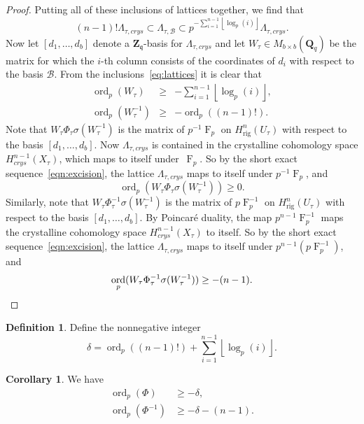 \documentclass[a4paper,11pt]{article}
\numberwithin{equation}{section}
\providecommand{\floor}[1]{\left\lfloor#1\right\rfloor}   %
\newcommand{\ZZ}{\mathbf{Z}} %
\newcommand{\QQ}{\mathbf{Q}} %
\DeclareMathOperator{\ord}{ord}          %
\DeclareMathOperator{\Frob}{F}           %
\providecommand{\Hrig}{H_{\text{rig}}}  %
\providecommand{\cB}{\mathcal{B}} %
\theoremstyle{definition}
\newtheorem{cor}[thm]{Corollary}
\newtheorem{defn}[thm]{Definition}
\begin{document}
\begin{proof}
Putting all of these inclusions of lattices together, we find that
\begin{equation} \label{eq:lattices}
(n-1)! \Lambda_{\tau,crys} \subset \Lambda_{\tau,\cB} \subset p^{-\sum_{i=1}^{n-1} \floor{\log_p(i)}} \Lambda_{\tau,crys}.
\end{equation}
Now let $[d_1, \dotsc, d_b]$ denote a $\ZZ_{\mathfrak{q}}$-basis for $\Lambda_{\tau,crys}$ and 
let $W_{\tau} \in M_{b \times b}(\QQ_q)$ be the matrix for which the $i$-th column 
consists of the coordinates of $d_i$ with respect to the basis $\cB$. From the 
inclusions~\eqref{eq:lattices} it is clear that 
\begin{eqnarray*}
\ord_p(W_{\tau}) &\geq& -\sum_{i=1}^{n-1} \floor{\log_p(i)}, \\
\ord_p(W_{\tau}^{-1}) &\geq& -\ord_p((n-1)!).
\end{eqnarray*}
Note that $W_{\tau} \Phi_{\tau} \sigma(W_{\tau}^{-1})$ is the matrix of 
$p^{-1}\Frob_{p}$ on $\Hrig^n(U_{\tau})$ with respect to the basis 
$[d_1,\dotsc,d_b]$. Now $\Lambda_{\tau,crys}$ is contained in the crystalline 
cohomology space $H^{n-1}_{crys}(X_{\tau})$, which maps to itself 
under~$\Frob_p$. So by the short exact sequence~\eqref{eqn:excision}, the 
lattice $\Lambda_{\tau,crys}$ maps to itself under $p^{-1}\Frob_{p}$, and
\[
\ord_p(W_{\tau} \Phi_{\tau} \sigma(W_{\tau}^{-1})) \geq 0.
\]
Similarly, note that $W_{\tau} \Phi_{\tau}^{-1} \sigma(W_{\tau}^{-1})$ is 
the matrix of $p\Frob_p^{-1}$ on $\Hrig^n(U_{\tau})$ with respect to the 
basis $[d_1,\dotsc,d_b]$. By Poincar\'e duality, the map $p^{n-1}\Frob_p^{-1}$ 
maps the crystalline cohomology space $H^{n-1}_{crys}(X_{\tau})$ to itself. 
So by the short exact sequence~\eqref{eqn:excision}, the lattice 
$\Lambda_{\tau,crys}$ maps to itself under $p^{n-1} (p\Frob_p^{-1})$, and 
\begin{equation*}
\ord_p(W_{\tau} \Phi_{\tau}^{-1} \sigma(W_{\tau}^{-1})) \geq -(n-1). \qedhere
\end{equation*}
\end{proof}

\begin{defn} \label{defn:delta}
Define the nonnegative integer
\[
\delta = \ord_p((n-1)!)+\sum_{i=1}^{n-1} \floor{\log_p(i)}.
\]
\end{defn}

\begin{cor} \label{cor:delta} We have 
\begin{align*}
\ord_p(\Phi) &\geq -\delta, \\
\ord_p(\Phi^{-1}) &\geq -\delta-(n-1).
\end{align*}
\end{cor}
\end{document}
